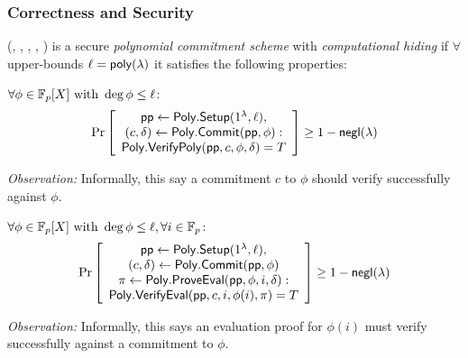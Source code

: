 \subsubsection{Correctness and Security}
\label{s:prelim:polycommit:correctness-and-security}

\begin{definition}
    \label{def:polycommit}
    (\polysetup, \polycommit, \polyverifypoly, \polycreatewitness, \polyverifyeval) is a secure \textit{polynomial commitment scheme} with \textit{computational hiding} if
    $\forall$ upper-bounds $\ell=\mathsf{poly}(\lambda)$
    it satisfies the following properties:
\end{definition}

\begin{definition}
$\forall \phi \in \Fp[X]\ \text{with}\ \deg{\phi}\le \ell$:
\begin{align*}
\Pr \left[ \begin{array}{c}
    \mathsf{pp} \leftarrow \mathsf{Poly.Setup}(1^\lambda, \ell),\\
    (c, \delta) \leftarrow \mathsf{Poly.Commit}(\mathsf{pp}, \phi) :\\
    \mathsf{Poly.VerifyPoly}(\mathsf{pp}, c, \phi, \delta) = T
\end{array} \right] \ge 1 - \mathsf{negl}(\lambda)
\end{align*}
\end{definition}

\noindent \textit{Observation:}
Informally, this say a commitment $c$ to $\phi$ should verify successfully against $\phi$.

\begin{definition}
$\forall \phi \in \Fp[X]\ \text{with}\ \deg{\phi}\le \ell, \forall i \in \Fp$:
\begin{align*}
\Pr \left[ \begin{array}{c}
    \mathsf{pp} \leftarrow \mathsf{Poly.Setup}(1^\lambda, \ell),\\
    (c, \delta) \leftarrow \mathsf{Poly.Commit}(\mathsf{pp}, \phi)\\
    \pi \leftarrow \mathsf{Poly.ProveEval}(\mathsf{pp}, \phi, i, \delta):\\
    \mathsf{Poly.VerifyEval{}}(\mathsf{pp}, c, i, \phi(i), \pi) = T
\end{array} \right] \ge 1 - \mathsf{negl}(\lambda)
\end{align*}
\end{definition}

\noindent \textit{Observation:}
Informally, this says an evaluation proof for $\phi(i)$ must verify successfully against a commitment to $\phi$.

